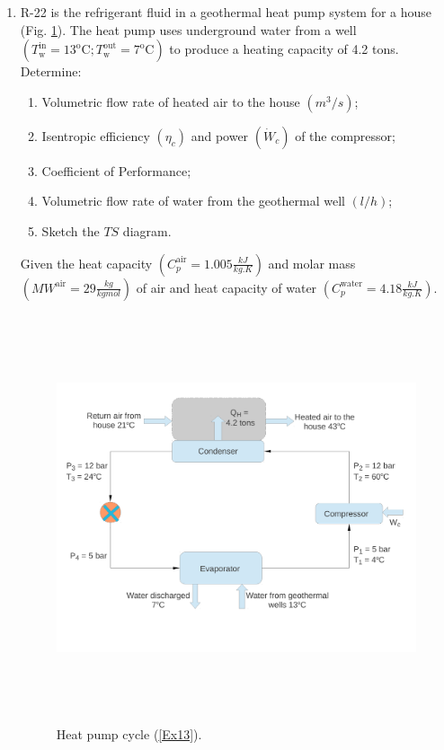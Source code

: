 \documentclass[12pts,a4paper,amsmath,amssymb,floatfix]{article}%
\begin{document}
\begin{enumerate}[label=\bfseries Problem \arabic*]
\item \label{Ex13} R-22 is the refrigerant fluid in a geothermal heat pump system for a house (Fig. \ref{Ex13:Fig}). The heat pump uses underground water from a well $\left(T_{\text{w}}^{\text{in}}=13^{\text{o}}\text{C}; T_{\text{w}}^{\text{out}}=7^{\text{o}}\text{C}\right)$ to produce a heating capacity of 4.2 tons. Determine:
\begin{enumerate}
 \item Volumetric flow rate of heated air to the house $\left(m^{3}/s\right)$;
 \item Isentropic efficiency $\left(\eta_{c}\right)$ and power $\left(\dot{W}_{c}\right)$ of the compressor;
 \item Coefficient of Performance;
 \item Volumetric flow rate of water from the geothermal well $\left(l/h\right)$;
 \item Sketch the $TS$ diagram.
\end{enumerate}
Given the heat capacity $\left(C_{p}^{\text{air}}=1.005\displaystyle\frac{kJ}{kg.K}\right)$ and molar mass $\left(MW^{\text{air}}=29\displaystyle\frac{kg}{kgmol}\right)$ of air and heat capacity of water $\left(C_{p}^{\text{water}}=4.18\displaystyle\frac{kJ}{kg.K}\right)$.

\begin{figure}[h]
\begin{center}
\includegraphics[width=16.0cm,height=12.0cm]{./Pics/Overview_Refrig42}
\end{center}
\caption{Heat pump cycle (\ref{Ex13}).}\label{Ex13:Fig}
\end{figure}
 
\end{enumerate}
\end{document}
